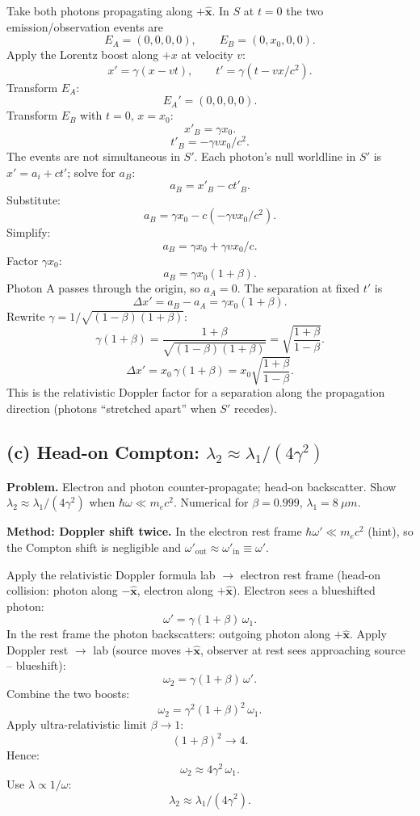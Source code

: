 \documentclass[11pt]{article}
\begin{document}
Take both photons propagating along $+\hat{\bm x}$. In $S$ at $t=0$ the two emission/observation events are
\[ E_A=(0,0,0,0),\qquad E_B=(0,x_0,0,0). \]
Apply the Lorentz boost along $+x$ at velocity $v$:
\[ x'=\gamma(x-vt),\qquad t'=\gamma(t-vx/c^2). \]
Transform $E_A$:
\[ E_A'=(0,0,0,0). \]
Transform $E_B$ with $t=0$, $x=x_0$:
\[ x'_B = \gamma x_0. \]
\[ t'_B = -\gamma v x_0/c^2. \]
The events are not simultaneous in $S'$. Each photon's null worldline in $S'$ is $x'=a_i + ct'$; solve for $a_B$:
\[ a_B = x'_B - c t'_B. \]
Substitute:
\[ a_B = \gamma x_0 - c(-\gamma v x_0/c^2). \]
Simplify:
\[ a_B = \gamma x_0 + \gamma v x_0/c. \]
Factor $\gamma x_0$:
\[ a_B = \gamma x_0(1+\beta). \]
Photon A passes through the origin, so $a_A=0$. The separation at fixed $t'$ is
\[ \Delta x' = a_B - a_A = \gamma x_0(1+\beta). \]
Rewrite $\gamma = 1/\sqrt{(1-\beta)(1+\beta)}$:
\[ \gamma(1+\beta) = \frac{1+\beta}{\sqrt{(1-\beta)(1+\beta)}} = \sqrt{\frac{1+\beta}{1-\beta}}. \]
\[ \boxed{\;\Delta x' = x_0\,\gamma(1+\beta) = x_0\sqrt{\frac{1+\beta}{1-\beta}}.\;} \]
This is the relativistic Doppler factor for a separation along the propagation direction (photons ``stretched apart'' when $S'$ recedes).

\subsection*{(c) Head-on Compton: $\lambda_2 \approx \lambda_1/(4\gamma^2)$}

\textbf{Problem.} Electron and photon counter-propagate; head-on backscatter. Show $\lambda_2 \approx \lambda_1/(4\gamma^2)$ when $\hbar\omega\ll m_e c^2$. Numerical for $\beta=0.999$, $\lambda_1=\SI{8}{\mu m}$.

\textbf{Method: Doppler shift twice.} In the electron rest frame $\hbar\omega'\ll m_ec^2$ (hint), so the Compton shift is negligible and $\omega'_\text{out}\approx \omega'_\text{in} \equiv \omega'$.

Apply the relativistic Doppler formula lab $\to$ electron rest frame (head-on collision: photon along $-\hat{\bm x}$, electron along $+\hat{\bm x}$). Electron sees a blueshifted photon:
\[ \omega' = \gamma(1+\beta)\,\omega_1. \]
In the rest frame the photon backscatters: outgoing photon along $+\hat{\bm x}$. Apply Doppler rest $\to$ lab (source moves $+\hat{\bm x}$, observer at rest sees approaching source -- blueshift):
\[ \omega_2 = \gamma(1+\beta)\,\omega'. \]
Combine the two boosts:
\[ \omega_2 = \gamma^2(1+\beta)^2\,\omega_1. \]
Apply ultra-relativistic limit $\beta\to 1$:
\[ (1+\beta)^2 \to 4. \]
Hence:
\[ \omega_2 \approx 4\gamma^2\,\omega_1. \]
Use $\lambda \propto 1/\omega$:
\[ \boxed{\;\lambda_2 \approx \lambda_1/(4\gamma^2).\;} \]
\end{document}
